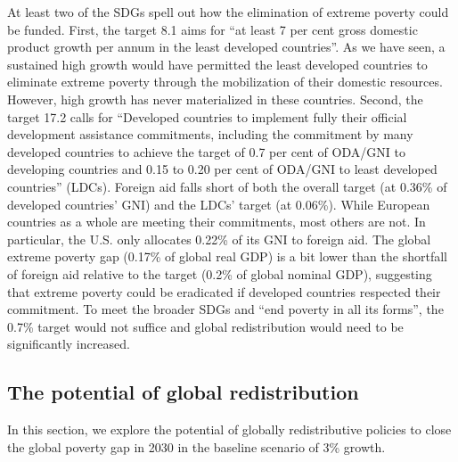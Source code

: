 At least two of the SDGs spell out how the elimination of extreme poverty could be funded. %
First, the target 8.1 aims for ``at least 7 per cent gross domestic product growth per annum in the least developed countries''. As we have seen, a sustained high growth would have permitted the least developed countries to eliminate extreme poverty through the mobilization of their domestic resources. However, high growth has never materialized in these countries. 
Second, the target 17.2 calls for ``Developed countries to implement fully their official development assistance commitments, including the commitment by many developed countries to achieve the target of 0.7 per cent of ODA/GNI to developing countries and 0.15 to 0.20 per cent of ODA/GNI to least developed countries'' (LDCs). Foreign aid falls short of both the overall target (at 0.36\% of developed countries' GNI) and the LDCs' target (at 0.06\%). While European countries as a whole are meeting their commitments, most others are not. In particular, the U.S. only allocates 0.22\% of its GNI to foreign aid.\cite{oecd_oda_2023} The global extreme poverty gap (0.17\% of global real GDP) is a bit lower than the shortfall of foreign aid relative to the target (0.2\% of global nominal GDP), suggesting that extreme poverty could be eradicated if developed countries respected their commitment. %
To meet the broader SDGs and ``end poverty in all its forms'', the 0.7\% target would not suffice and global redistribution would need to be significantly increased. %

\subsection{The potential of global redistribution}

In this section, we explore the potential of globally redistributive policies to close the global poverty gap in 2030 in the baseline scenario of 3\% growth. 

